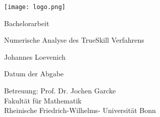 \documentclass[12pt,a4paper]{scrartcl}
\numberwithin{equation}{section}
\begin{document}
  \pagestyle{empty}

  \begin{titlepage}

    \texttt{[image: logo.png]} 
    \vspace*{2cm} 

 \begin{center} \large 
    
    Bachelorarbeit
    \vspace*{2cm}

    {\huge Numerische Analyse des TrueSkill Verfahrens}
    \vspace*{2.5cm}

    Johannes Loevenich
    \vspace*{1.5cm}

    Datum der Abgabe
    \vspace*{4.5cm}


    Betreuung: Prof. Dr. Jochen Garcke \\[1cm]
    Fakultät für Mathematik \\
		Rheinische Friedrich-Wilhelms- Universität Bonn 
  \end{center}
\end{titlepage}



  \tableofcontents

\newpage
 


  \pagestyle{useheadings}
\end{document}

